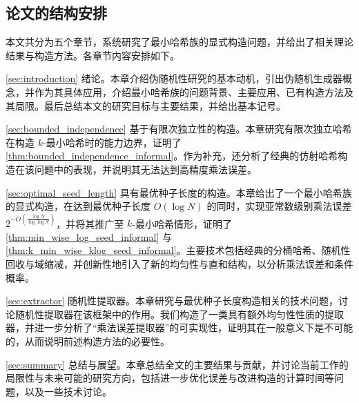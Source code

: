 \subsection{论文的结构安排}

本文共分为五个章节，系统研究了最小哈希族的显式构造问题，并给出了相关理论结果与构造方法。各章节内容安排如下。

\ref{sec:introduction} 绪论。本章介绍伪随机性研究的基本动机，引出伪随机生成器概念，并作为其具体应用，介绍最小哈希族的问题背景、主要应用、已有构造方法及其局限。最后总结本文的研究目标与主要结果，并给出基本记号。

\ref{sec:bounded_independence} 基于有限次独立性的构造。本章研究有限次独立哈希在构造 $k$-最小哈希时的能力边界，证明了 \cref{thm:bounded_independence_informal}。作为补充，还分析了经典的仿射哈希构造在该问题中的表现，并说明其无法达到高精度乘法误差。

\ref{sec:optimal_seed_length} 具有最优种子长度的构造。本章给出了一个最小哈希族的显式构造，在达到最优种子长度 $O(\log N)$ 的同时，实现亚常数级别乘法误差 $2^{-O\left( \frac{\log N}{\log \log N} \right)}$，并将其推广至 $k$-最小哈希情形，证明了 \cref{thm:min_wise_log_seed_informal} 与 \cref{thm:k_min_wise_klog_seed_informal}。主要技术包括经典的分桶哈希、随机性回收与域缩减，并创新性地引入了新的均匀性与直和结构，以分析乘法误差和条件概率。

\ref{sec:extractor} 随机性提取器。本章研究与最优种子长度构造相关的技术问题，讨论随机性提取器在该框架中的作用。我们构造了一类具有额外均匀性性质的提取器，并进一步分析了“乘法误差提取器”的可实现性，证明其在一般意义下是不可能的，从而说明前述构造方法的必要性。

\ref{sec:summary} 总结与展望。本章总结全文的主要结果与贡献，并讨论当前工作的局限性与未来可能的研究方向，包括进一步优化误差与改进构造的计算时间等问题，以及一些技术讨论。